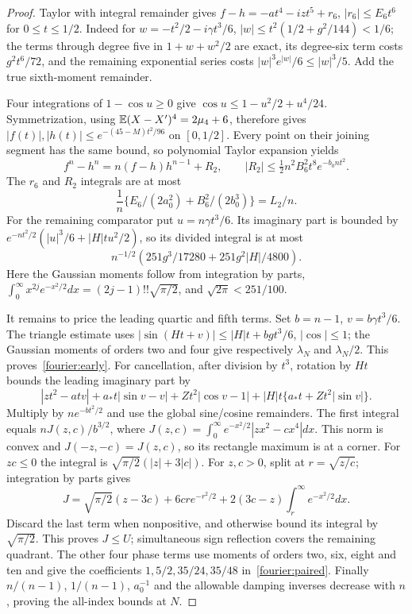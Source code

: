 \begin{proof}
Taylor with integral remainder gives
$f-h=-at^4-izt^5+r_6$, $|r_6|\le E_6t^6$ for $0\le t\le1/2$.
Indeed for $w=-t^2/2-i\gamma t^3/6$,
$|w|\le t^2(1/2+g^2/144)<1/6$; the terms through degree five in
$1+w+w^2/2$ are exact, its degree-six term costs $g^2t^6/72$, and
the remaining exponential series costs $|w|^3e^{|w|}/6\le|w|^3/5$.
Add the true sixth-moment remainder.

Four integrations of $1-\cos u\ge0$ give
$\cos u\le1-u^2/2+u^4/24$. Symmetrization, using
$\mathbb E(X-X')^4=2\mu_4+6$, therefore gives
$|f(t)|,|h(t)|\le e^{-(45-M)t^2/96}$ on $[0,1/2]$.
Every point on their joining segment has the same bound, so polynomial
Taylor expansion yields
\[
 f^n-h^n=n(f-h)h^{n-1}+R_2,\qquad
 |R_2|\le\tfrac12n^2B_6^2t^8e^{-b_0nt^2}.
\]
The $r_6$ and $R_2$ integrals are at most
\begin{equation}\label{fourier:common-error}
 \frac1n\{E_6/(2a_0^2)+B_6^2/(2b_0^3)\}=L_2/n.
\end{equation}
For the remaining comparator put $u=n\gamma t^3/6$. Its imaginary part
is bounded by $e^{-nt^2/2}(|u|^3/6+|H|tu^2/2)$, so its divided integral
is at most
\begin{equation}\label{fourier:comparator-low}
 n^{-1/2}(251g^3/17280+251g^2|H|/4800).
\end{equation}
Here the Gaussian moments follow from integration by parts,
$\int_0^\infty x^{2j}e^{-x^2/2}dx=(2j-1)!!\sqrt{\pi/2}$,
and $\sqrt{2\pi}<251/100$.

It remains to price the leading quartic and fifth terms. Set $b=n-1$,
$v=b\gamma t^3/6$. The triangle estimate uses
$|\sin(Ht+v)|\le|H|t+bg t^3/6$, $|\cos|\le1$; the Gaussian
moments of orders two and four give respectively $\lambda_N$ and
$\lambda_N/2$. This proves~\eqref{fourier:early}.
For cancellation, after division by $t^3$, rotation by $Ht$ bounds the
leading imaginary part by
\[
 |zt^2-atv|+a_*t|\sin v-v|+Zt^2|\cos v-1|
       +|H|t\{a_*t+Zt^2|\sin v|\}.
\]
Multiply by $ne^{-bt^2/2}$ and use the global sine/cosine remainders.
The first integral equals $nJ(z,c)/b^{3/2}$, where
$J(z,c)=\int_0^\infty e^{-x^2/2}|zx^2-cx^4|dx$.
This norm is convex and $J(-z,-c)=J(z,c)$, so its rectangle maximum
is at a corner. For $zc\le0$ the integral is
$\sqrt{\pi/2}(|z|+3|c|)$. For $z,c>0$, split at $r=\sqrt{z/c}$;
integration by parts gives
\[
 J=\sqrt{\pi/2}(z-3c)+6cr e^{-r^2/2}
       +2(3c-z)\int_r^\infty e^{-x^2/2}dx.
\]
Discard the last term when nonpositive, and otherwise bound its integral
by $\sqrt{\pi/2}$. This proves $J\le U$; simultaneous sign reflection
covers the remaining quadrant. The other four phase terms use moments
of orders two, six, eight and ten and give the coefficients
$1,5/2,35/24,35/48$ in~\eqref{fourier:paired}. Finally $n/(n-1)$,
$1/(n-1)$, $a_0^{-1}$ and the allowable damping inverses decrease with
$n$, proving the all-index bounds at $N$.
\end{proof}

